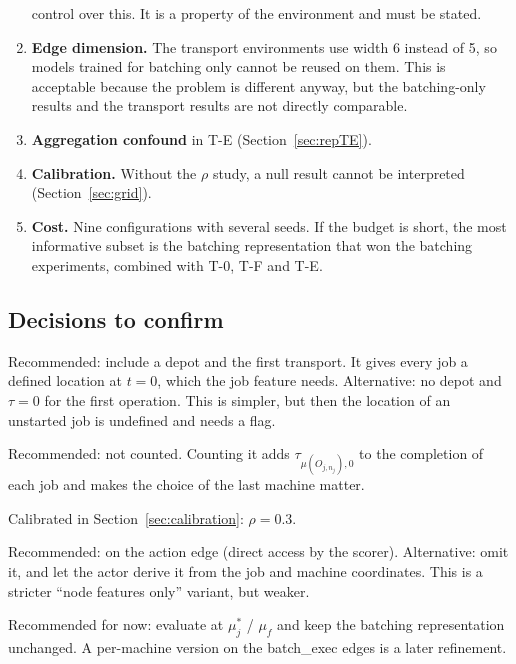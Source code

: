 \documentclass[11pt,a4paper]{article}
\begin{document}
\begin{enumerate}
    control over this. It is a property of the environment and must be stated.
  \item \textbf{Edge dimension.} The transport environments use width 6 instead
    of 5, so models trained for batching only cannot be reused on them. This is
    acceptable because the problem is different anyway, but the batching-only
    results and the transport results are not directly comparable.
  \item \textbf{Aggregation confound} in T-E (Section~\ref{sec:repTE}).
  \item \textbf{Calibration.} Without the $\rho$ study, a null result cannot be
    interpreted (Section~\ref{sec:grid}).
  \item \textbf{Cost.} Nine configurations with several seeds. If the budget is
    short, the most informative subset is the batching representation that won
    the batching experiments, combined with T-0, T-F and T-E.
\end{enumerate}

\subsection{Decisions to confirm}
\begin{description}[style=nextline]
  \item[D1 -- Depot.] Recommended: include a depot and the first transport. It
    gives every job a defined location at $t=0$, which the job feature needs.
    Alternative: no depot and $\tau=0$ for the first operation. This is simpler,
    but then the location of an unstarted job is undefined and needs a flag.
  \item[D2 -- Return to the depot.] Recommended: not counted. Counting it adds
    $\tau_{\mu(O_{j,n_j}),0}$ to the completion of each job and makes the choice
    of the last machine matter.
  \item[D3 -- Transport magnitude $\rho$.] Calibrated in
    Section~\ref{sec:calibration}: $\rho=0.3$.
  \item[D4 -- I3 in T-F.] Recommended: on the action edge (direct access by the
    scorer). Alternative: omit it, and let the actor derive it from the job and
    machine coordinates. This is a stricter ``node features only'' variant, but
    weaker.
  \item[D5 -- Batch features per machine.] Recommended for now: evaluate at
    $\mu^\ast_j$ / $\mu_f$ and keep the batching representation unchanged. A
    per-machine version on the \textsf{batch\_exec} edges is a later refinement.
\end{description}
\end{document}
